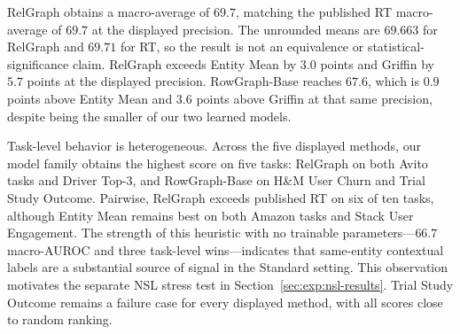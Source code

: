 RelGraph obtains a macro-average of \(69.7\), matching the published RT
macro-average of \(69.7\) at the displayed precision. The unrounded means
are \(69.663\) for RelGraph and \(69.71\) for RT, so the result is not an
equivalence or statistical-significance claim. RelGraph exceeds Entity Mean
by \(3.0\) points and Griffin by \(5.7\) points at the displayed precision.
RowGraph-Base reaches \(67.6\), which is \(0.9\) points above Entity Mean
and \(3.6\) points above Griffin at that same precision, despite being the
smaller of our two learned models.

Task-level behavior is heterogeneous. Across the five displayed methods,
our model family obtains the highest score on five tasks: RelGraph on both
Avito tasks and Driver Top-3, and RowGraph-Base on H\&M User Churn and Trial
Study Outcome. Pairwise, RelGraph exceeds published RT on six of ten tasks,
although Entity Mean remains best on both Amazon tasks and Stack User
Engagement. The strength of this heuristic with no trainable
parameters---\(66.7\) macro-AUROC and three task-level wins---indicates that
same-entity contextual
labels are a substantial source of signal in the Standard setting. This
observation motivates the separate NSL stress test in
Section~\ref{sec:exp:nsl-results}. Trial Study Outcome remains a failure
case for every displayed method, with all scores close to random ranking.

